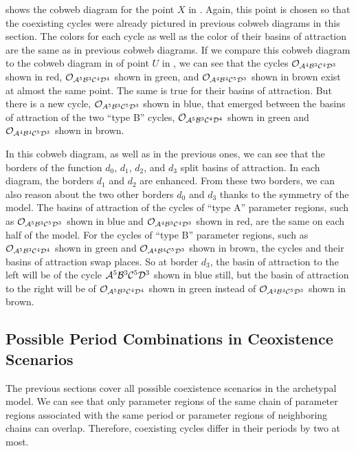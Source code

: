  shows the cobweb diagram for the point $X$ in .
Again, this point is chosen so that the coexisting cycles were already pictured in previous cobweb diagrams in this section.
The colors for each cycle as well as the color of their basins of attraction are the same as in previous cobweb diagrams.
If we compare this cobweb diagram to the cobweb diagram in  of point $U$ in , we can see that the cycles $\mathcal{O}_{\mathcal{A}^4\mathcal{B}^3\mathcal{C}^4\mathcal{D}^3}$ shown in red, $\mathcal{O}_{\mathcal{A}^5\mathcal{B}^3\mathcal{C}^4\mathcal{D}^4}$ shown in green, and $\mathcal{O}_{\mathcal{A}^4\mathcal{B}^4\mathcal{C}^5\mathcal{D}^3}$ shown in brown exist at almost the same point.
The same is true for their basins of attraction.
But there is a new cycle, $\mathcal{O}_{A^5\mathcal{B}^3\mathcal{C}^5\mathcal{D}^3}$ shown in blue, that emerged between the basins of attraction of the two ``type B'' cycles, $\mathcal{O}_{\mathcal{A}^5\mathcal{B}^3\mathcal{C}^4\mathcal{D}^4}$ shown in green and $\mathcal{O}_{\mathcal{A}^4\mathcal{B}^4\mathcal{C}^5\mathcal{D}^3}$ shown in brown.

In this cobweb diagram, as well as in the previous ones, we can see that the borders of the function $d_0$, $d_1$, $d_2$, and $d_3$ split basins of attraction.
In each diagram, the borders $d_1$ and $d_2$ are enhanced.
From these two borders, we can also reason about the two other borders $d_0$ and $d_3$ thanks to the symmetry of the model.
The basins of attraction of the cycles of ``type A'' parameter regions, such as $\mathcal{O}_{\mathcal{A}^5\mathcal{B}^3\mathcal{C}^5\mathcal{D}^3}$ shown in blue and $\mathcal{O}_{\mathcal{A}^4\mathcal{B}^3\mathcal{C}^4\mathcal{D}^3}$ shown in red, are the same on each half of the model.
For the cycles of ``type B'' parameter regions, such as $\mathcal{O}_{\mathcal{A}^5\mathcal{B}^3\mathcal{C}^4\mathcal{D}^4}$ shown in green and $\mathcal{O}_{\mathcal{A}^4\mathcal{B}^4\mathcal{C}^5\mathcal{D}^3}$ shown in brown, the cycles and their basins of attraction swap places.
So at border $d_3$, the basin of attraction to the left will be of the cycle $\mathcal{A}^5\mathcal{B}^3\mathcal{C}^5\mathcal{D}^3$ shown in blue still, but the basin of attraction to the right will be of $\mathcal{O}_{\mathcal{A}^5\mathcal{B}^3\mathcal{C}^4\mathcal{D}^4}$ shown in green instead of $\mathcal{O}_{\mathcal{A}^4\mathcal{B}^4\mathcal{C}^5\mathcal{D}^3}$ shown in brown.

\subsection{Possible Period Combinations in Ceoxistence Scenarios}

The previous sections cover all possible coexistence scenarios in the archetypal model.
We can see that only parameter regions of the same chain of parameter regions associated with the same period or parameter regions of neighboring chains can overlap.
Therefore, coexisting cycles differ in their periods by two at most.

